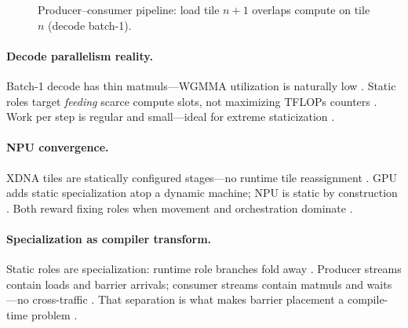 \begin{figure}[t]
\centering
{}
\caption{Producer--consumer pipeline: load tile $n{+}1$ overlaps compute on tile $n$ (decode batch-1).}
\label{fig:ch07_producer_consumer_timeline}
\end{figure}

\paragraph{Decode parallelism reality.}
Batch-1 decode has thin matmuls---WGMMA utilization is naturally low \citep{patel2025llminference,shah2024flashattention3}.
Static roles target \emph{feeding} scarce compute slots, not maximizing TFLOPs counters \citep{memoryfloor2026,taxbreak2026}.
Work per step is regular and small---ideal for extreme staticization \citep{kwon2023vllm,yirage2026}.

\paragraph{NPU convergence.}
XDNA tiles are statically configured stages---no runtime tile reassignment \citep{amd2024xdna,amd2024aie}.
GPU adds static specialization atop a dynamic machine; NPU is static by construction \citep{patel2025llminference,chen2020compilerbasedhardw}.
Both reward fixing roles when movement and orchestration dominate \citep{taxbreak2026,memoryfloor2026}.

\paragraph{Specialization as compiler transform.}
Static roles are specialization: runtime role branches fold away \citep{shah2024flashattention3,wu2024mirage}.
Producer streams contain loads and barrier arrivals; consumer streams contain matmuls and waits---no cross-traffic \citep{semianalysis2024tma,nvidia2022hopper}.
That separation is what makes barrier placement a compile-time problem \citep{yirage2026,chen2020compilerbasedhardw}.

